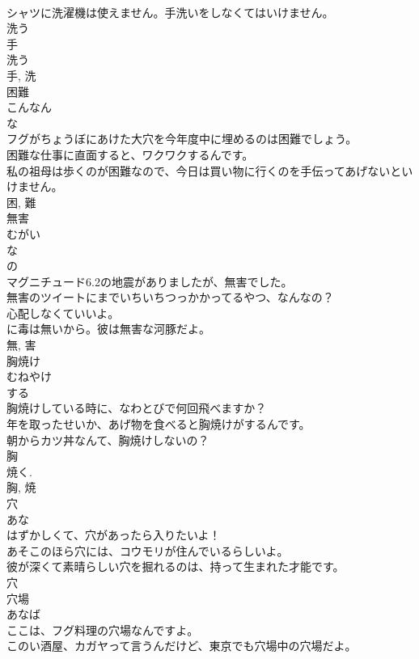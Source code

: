 \documentclass[8pt]{extreport}
\begin{document}
\begin{CJK}{UTF8}{min}
\\	シャツに洗濯機は使えません。手洗いをしなくてはいけません。	
\\	洗う 
\\	手 
\\	洗う 
\\	手, 洗	
\\	困難	
\\	こんなん	
\\	な 
\\	フグがちょうぼにあけた大穴を今年度中に埋めるのは困難でしょう。	
\\	困難な仕事に直面すると、ワクワクするんです。	
\\	私の祖母は歩くのが困難なので、今日は買い物に行くのを手伝ってあげないといけません。	
\\	困, 難	
\\	無害	
\\	むがい	
\\	な 
\\	の 
\\	マグニチュード6.2の地震がありましたが、無害でした。	
\\	無害のツイートにまでいちいちつっかかってるやつ、なんなの？	
\\	心配しなくていいよ。
\\	に毒は無いから。彼は無害な河豚だよ。	
\\	無, 害	
\\	胸焼け	
\\	むねやけ	
\\	する 
\\	胸焼けしている時に、なわとびで何回飛べますか？	
\\	年を取ったせいか、あげ物を食べると胸焼けがするんです。	
\\	朝からカツ丼なんて、胸焼けしないの？	
\\	胸 
\\	焼く. 
\\	胸, 焼	
\\	穴	
\\	あな	
\\	はずかしくて、穴があったら入りたいよ！	
\\	あそこのほら穴には、コウモリが住んでいるらしいよ。	
\\	彼が深くて素晴らしい穴を掘れるのは、持って生まれた才能です。	
\\	穴	
\\	穴場	
\\	あなば	
\\	ここは、フグ料理の穴場なんですよ。	
\\	このい酒屋、カガヤって言うんだけど、東京でも穴場中の穴場だよ。	

\end{CJK}
\end{document}
